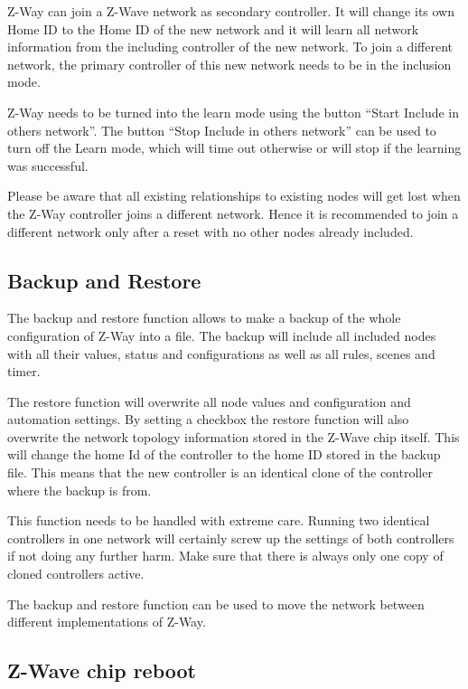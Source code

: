 Z-Way can join a Z-Wave network as secondary controller. It will change its own Home ID to the 
Home ID of the new network and it will learn all network information from the including controller 
of the new network. To join a different network, the primary controller of this new network needs 
to be in the inclusion mode.

Z-Way needs to be turned into the learn mode using the button “Start Include in others network”. 
The button “Stop Include in others network” can be used to turn off the Learn mode, which will 
time out otherwise or will stop if the learning was successful.

Please be aware that all existing relationships to existing nodes will get lost when the Z-Way 
controller joins a different network. Hence it is recommended to join a different network only 
after a reset with no other nodes already included.


\subsection{Backup and Restore}

The backup and restore function allows to make a backup of the whole configuration of Z-Way 
into a file. The backup will include all included nodes with all their values, status and 
configurations as well as all rules, scenes and timer.

The restore function will overwrite all node values and configuration and automation settings. 
By setting a checkbox the restore function will also overwrite the network topology information 
stored in the Z-Wave chip itself. This will change the home Id of the controller to the home ID 
stored in the backup file. This means that the new controller is an identical clone of the controller 
where the backup is from.

This function needs to be handled with extreme care. Running two identical controllers in one 
network will certainly screw up the settings of both controllers if not doing any further harm. 
Make sure that there is always only one copy of cloned controllers active.

The backup and restore function can be used to move the network between different implementations 
of Z-Way.

\subsection{Z-Wave chip reboot}

